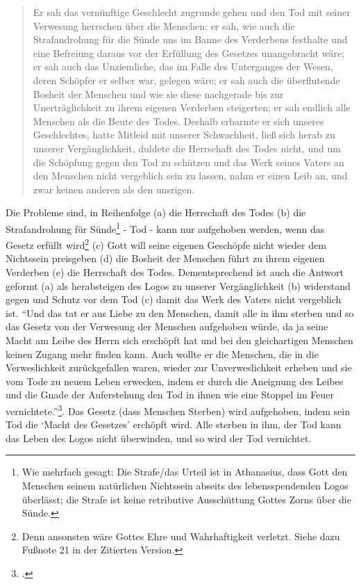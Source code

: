 \begin{quote}
Er sah das vernünftige Geschlecht zugrunde gehen und den Tod mit seiner Verwesung herrschen über die Menschen;
er sah, wie auch die Strafandrohung für die Sünde uns im Banne des Verderbens festhalte und eine Befreiung daraus vor der Erfüllung des Gesetzes unangebracht wäre;
er sah auch das Unziemliche, das im Falle des Unterganges der Wesen, deren Schöpfer er selber war, gelegen wäre;
er sah auch die überflutende Bosheit der Menschen und wie sie diese nachgerade bis zur Unerträglichkeit zu ihrem eigenen Verderben steigerten;
er sah endlich alle Menschen als die Beute des Todes.
Deshalb erbarmte er sich unseres Geschlechtes, hatte Mitleid mit unserer
Schwachheit, ließ sich herab zu unserer Vergänglichkeit, duldete die Herrschaft des Todes
nicht, und um die Schöpfung gegen den Tod zu schützen und das Werk seines Vaters an
den Menschen nicht vergeblich sein zu lassen, nahm er einen Leib an, und zwar keinen
anderen als den unsrigen.
\end{quote}
Die Probleme sind, in Reihenfolge
(a) die Herrschaft des Todes
(b) die Strafandrohung für Sünde\footnote{
Wie mehrfach gesagt: Die Strafe/das Urteil ist in Athanasius, dass Gott den Menschen seinem natürlichen Nichtssein abseits des lebensspendenden Logos überlässt; die Strafe ist keine retributive Ausschüttung Gottes Zorns über die Sünde.}
- Tod - kann nur aufgehoben werden, wenn das Gesetz erfüllt wird\footnote{Denn ansonsten wäre Gottes Ehre und Wahrhaftigkeit verletzt. Siehe dazu Fußnote 21 in der Zitierten Version.}
(c) Gott will seine eigenen Geschöpfe nicht wieder dem Nichtssein preisgeben
(d) die Bosheit der Menschen führt zu ihrem eigenen Verderben
(e) die Herrschaft des Todes.
Dementsprechend ist auch die Antwort geformt (a) als herabsteigen des Logos zu unserer Vergänglichkeit (b) widerstand gegen und Schutz vor dem Tod (c) damit das Werk des Vaters nicht vergeblich ist.
``Und das tat er aus Liebe zu den Menschen, damit alle in ihm sterben
und so das Gesetz von der Verwesung der Menschen aufgehoben würde, da ja seine Macht
am Leibe des Herrn sich erschöpft hat und bei den gleichartigen Menschen keinen Zugang
mehr finden kann. Auch wollte er die Menschen, die in die Verweslichkeit zurückgefallen
waren, wieder zur Unverweslichkeit erheben und sie vom Tode zu neuem Leben erwecken,
indem er durch die Aneignung des Leibes und die Gnade der Auferstehung den Tod in
ihnen wie eine Stoppel im Feuer vernichtete.''\Footcite[8]{de-incarnatione-verbi}.
Das Gesetz (dass Menschen Sterben) wird aufgehoben, indem sein Tod die `Macht des Gesetzes' erchöpft wird.
Alle sterben in ihm, der Tod kann das Leben des Logos nicht überwinden, und so wird der Tod vernichtet.

